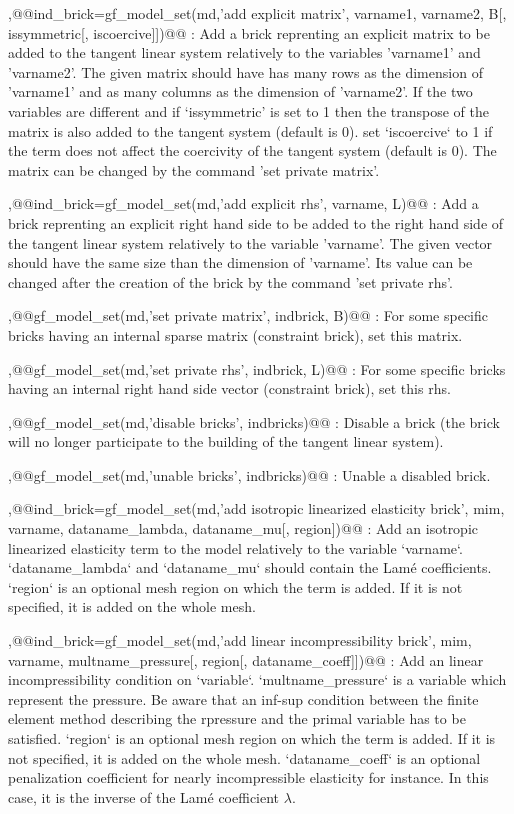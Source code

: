 \begin{cmddescription}
\sep{@@ind_brick=gf_model_set(md,'add explicit matrix', \tstr varname1, \tstr varname2, \tmat B[, \tint issymmetric[, \tint iscoercive]])@@} :
Add a brick reprenting an explicit matrix to be added to the tangent
linear system relatively to the variables 'varname1' and 'varname2'.
The given matrix should have has many rows as the dimension of
'varname1' and as many columns as the dimension of 'varname2'.
If the two variables are different and if `issymmetric' is set to 1
then the transpose of the matrix is also added to the tangent system
(default is 0). set `iscoercive` to 1 if the term does not affect the
coercivity of the tangent system (default is 0).
The matrix can be changed by the command 'set private matrix'.

\sep{@@ind_brick=gf_model_set(md,'add explicit rhs', \tstr varname, \tvec L)@@} :
Add a brick reprenting an explicit right hand side to be added to
the right hand side of the tangent
linear system relatively to the variable 'varname'.
The given vector should have the same size than the dimension of
'varname'. Its value can be changed after the creation of the brick by
the command 'set private rhs'. 

\sep{@@gf_model_set(md,'set private matrix',  \tint indbrick, \tmat B)@@} :
For some specific bricks having an internal sparse matrix
(constraint brick), set this matrix. 

\sep{@@gf_model_set(md,'set private rhs',  \tint indbrick, \tvec L)@@} :
For some specific bricks having an internal right hand side vector
(constraint brick), set this rhs.

\sep{@@gf_model_set(md,'disable bricks',  \tivec indbricks)@@} :
Disable a brick (the brick will no longer participate to the
building of the tangent linear system).

\sep{@@gf_model_set(md,'unable bricks',  \tivec indbricks)@@} :
Unable a disabled brick.

\sep{@@ind_brick=gf_model_set(md,'add isotropic linearized elasticity brick', \tmim mim, \tstr varname, \tstr dataname_lambda, \tstr dataname_mu[, \tint region])@@} :
Add an isotropic linearized elasticity term to the model relatively to the
variable `varname`.
`dataname_lambda` and `dataname_mu` should contain the Lam\'e coefficients.
`region` is an optional mesh region on which the term is added.
If it is not specified, it is added on the whole mesh.

\sep{@@ind_brick=gf_model_set(md,'add linear incompressibility brick', \tmim mim, \tstr varname, \tstr multname_pressure[, \tint region[, \tstr dataname_coeff]])@@} :
Add an linear incompressibility condition on `variable`.
`multname_pressure` is a variable which represent the pressure.
Be aware that an inf-sup condition between the finite element method
describing the rpressure and the primal variable has to be satisfied.
`region` is an optional mesh region on which the term is added.
If it is not specified, it is added on the whole mesh.
`dataname_coeff` is an optional penalization coefficient for nearly
incompressible elasticity for instance. In this case, it is the inverse
of the Lam\'e coefficient $\lambda$.


\end{cmddescription}
